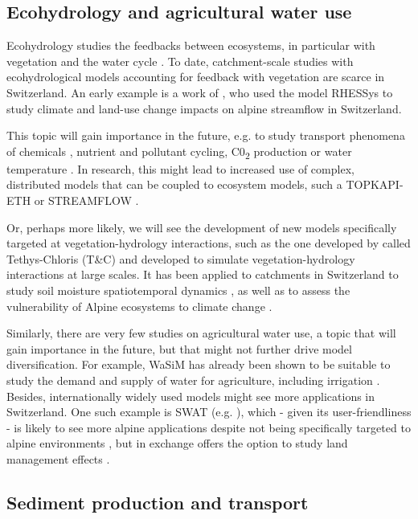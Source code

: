 \documentclass[10pt,a4paper]{article}
\begin{document}
\subsection{Ecohydrology and agricultural water use}
\label{sec:application:echohydrology}

Ecohydrology studies the feedbacks between ecosystems, in particular
with vegetation and the water cycle \citep{tague200}. To date,
catchment-scale studies with ecohydrological models accounting for
feedback with vegetation are scarce in Switzerland. An early example is
a work of \citet{zierl05}, who used the model RHESSys to study
climate and land-use change impacts on alpine streamflow in
Switzerland. 

This topic will gain importance in the future, e.g. to study transport
phenomena of chemicals \citep{queloz2015}, nutrient and pollutant
cycling, C0\textsubscript{2} production or water
temperature \citep{michel2020}. In research, this might lead to
increased use of complex, distributed models that can be coupled to
ecosystem models, such a TOPKAPI-ETH \citep{Pappas_2015} or
STREAMFLOW \citep{Gallice_2016}.

Or, perhaps more likely, we will see the development of new models
specifically targeted at vegetation-hydrology interactions, such as the
one developed by \citet{Fatichi2012,Fatichi2012a} called Tethys-Chloris (T\&C) and
developed to simulate vegetation-hydrology interactions at large scales.
It has been applied to catchments in Switzerland to study soil moisture
spatiotemporal dynamics \citep{Fatichi2015a}, as well as to assess the
vulnerability of Alpine ecosystems to climate change \citep{Mastrotheodoros2019}.

Similarly, there are very few studies on agricultural water use, a topic
that will gain importance in the future, but that might not further
drive model diversification. For example, WaSiM has already been
shown to be suitable to study the demand and supply of water for
agriculture, including irrigation \citep{Fuhrer2012}. Besides,
internationally widely used models might see more applications in
Switzerland. One such example is SWAT (e.g. \citealt{Abbaspour2007} ), which
- given its user-friendliness - is likely to see more alpine
applications despite not being specifically targeted to alpine
environments \citep{Andrianaki2019}, but in exchange offers the option to
study land management effects \citep{Zarrineh2018}.

\subsection{Sediment production and transport}
\label{sec:application:sediment}
\end{document}
